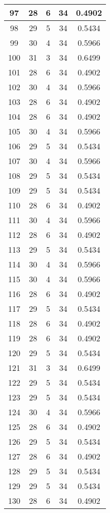 \documentclass[letterpaper, 12pt]{article}
\begin{document}
\begin{longtable}{|c|c|c|c|c|}
\hline
97 & 28 & 6 & 34 & 0.4902 \\
\hline
98 & 29 & 5 & 34 & 0.5434 \\
\hline
99 & 30 & 4 & 34 & 0.5966 \\
\hline
100 & 31 & 3 & 34 & 0.6499 \\
\hline
101 & 28 & 6 & 34 & 0.4902 \\
\hline
102 & 30 & 4 & 34 & 0.5966 \\
\hline
103 & 28 & 6 & 34 & 0.4902 \\
\hline
104 & 28 & 6 & 34 & 0.4902 \\
\hline
105 & 30 & 4 & 34 & 0.5966 \\
\hline
106 & 29 & 5 & 34 & 0.5434 \\
\hline
107 & 30 & 4 & 34 & 0.5966 \\
\hline
108 & 29 & 5 & 34 & 0.5434 \\
\hline
109 & 29 & 5 & 34 & 0.5434 \\
\hline
110 & 28 & 6 & 34 & 0.4902 \\
\hline
111 & 30 & 4 & 34 & 0.5966 \\
\hline
112 & 28 & 6 & 34 & 0.4902 \\
\hline
113 & 29 & 5 & 34 & 0.5434 \\
\hline
114 & 30 & 4 & 34 & 0.5966 \\
\hline
115 & 30 & 4 & 34 & 0.5966 \\
\hline
116 & 28 & 6 & 34 & 0.4902 \\
\hline
117 & 29 & 5 & 34 & 0.5434 \\
\hline
118 & 28 & 6 & 34 & 0.4902 \\
\hline
119 & 28 & 6 & 34 & 0.4902 \\
\hline
120 & 29 & 5 & 34 & 0.5434 \\
\hline
121 & 31 & 3 & 34 & 0.6499 \\
\hline
122 & 29 & 5 & 34 & 0.5434 \\
\hline
123 & 29 & 5 & 34 & 0.5434 \\
\hline
124 & 30 & 4 & 34 & 0.5966 \\
\hline
125 & 28 & 6 & 34 & 0.4902 \\
\hline
126 & 29 & 5 & 34 & 0.5434 \\
\hline
127 & 28 & 6 & 34 & 0.4902 \\
\hline
128 & 29 & 5 & 34 & 0.5434 \\
\hline
129 & 29 & 5 & 34 & 0.5434 \\
\hline
130 & 28 & 6 & 34 & 0.4902 \\

\end{longtable}
\end{document}
